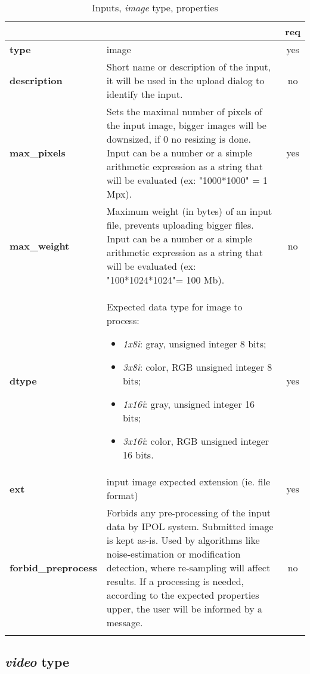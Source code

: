 \begin{longtable}{|>{\bf}L{\linewidth}|L{\linewidth}|c|}
\hline
{}     &  & {\bf req} \tabularnewline 
\hline \hline
 type         & image & yes \\ \hline
 description  & Short name or description of the input, it will be used in the upload dialog to identify the input. & no \\ \hline
 max\_pixels   &  Sets the maximal number of pixels of the input image, 
bigger images will be downsized, if 0 no resizing is done. 
Input can be a number or a simple arithmetic expression as a string that will be evaluated (ex: "1000*1000" = 1 Mpx).  & yes \\ \hline
 max\_weight   & Maximum weight (in bytes) of an input file, prevents uploading 
bigger files.
Input can be a number or a simple arithmetic expression as a string that will be evaluated (ex: "100*1024*1024"= 100 Mb). & no \\ \hline
 dtype        & Expected data type for image to process:
\vspace{-1em}
\begin{itemize}
  \setlength\itemsep{-0.5em}
  \item \textit{1x8i}: gray, unsigned integer 8 bits;
  \item \textit{3x8i}: color, RGB unsigned integer 8 bits;
  \item \textit{1x16i}: gray, unsigned integer 16 bits;
  \item \textit{3x16i}: color, RGB unsigned integer 16 bits.
\end{itemize} 
\vspace{-1em} & yes \\ \hline
 ext          & input image expected extension (ie. file format) & yes \\ \hline
forbid\_preprocess         & Forbids any pre-processing of the input data by IPOL system. 
Submitted image is kept as-is.
Used by algorithms like noise-estimation or modification detection, where re-sampling will affect results. 
If a processing is needed, according to the expected properties upper, the user will be informed by a message.
& no \\ \hline
\caption{Inputs, \emph{image} type, properties}
\end{longtable}

\subsection{\emph{video} type}


